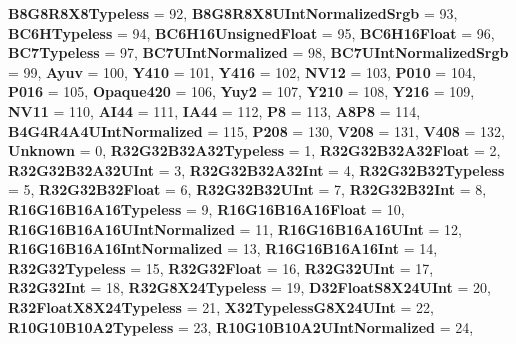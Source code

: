 \begin{DoxyCompactItemize}
{\bfseries B8\+G8\+R8\+X8\+Typeless} = 92, 
{\bfseries B8\+G8\+R8\+X8\+U\+Int\+Normalized\+Srgb} = 93, 
{\bfseries B\+C6\+H\+Typeless} = 94, 
\newline
{\bfseries B\+C6\+H16\+Unsigned\+Float} = 95, 
{\bfseries B\+C6\+H16\+Float} = 96, 
{\bfseries B\+C7\+Typeless} = 97, 
{\bfseries B\+C7\+U\+Int\+Normalized} = 98, 
\newline
{\bfseries B\+C7\+U\+Int\+Normalized\+Srgb} = 99, 
{\bfseries Ayuv} = 100, 
{\bfseries Y410} = 101, 
{\bfseries Y416} = 102, 
\newline
{\bfseries N\+V12} = 103, 
{\bfseries P010} = 104, 
{\bfseries P016} = 105, 
{\bfseries Opaque420} = 106, 
\newline
{\bfseries Yuy2} = 107, 
{\bfseries Y210} = 108, 
{\bfseries Y216} = 109, 
{\bfseries N\+V11} = 110, 
\newline
{\bfseries A\+I44} = 111, 
{\bfseries I\+A44} = 112, 
{\bfseries P8} = 113, 
{\bfseries A8\+P8} = 114, 
\newline
{\bfseries B4\+G4\+R4\+A4\+U\+Int\+Normalized} = 115, 
{\bfseries P208} = 130, 
{\bfseries V208} = 131, 
{\bfseries V408} = 132, 
\newline
{\bfseries Unknown} = 0, 
{\bfseries R32\+G32\+B32\+A32\+Typeless} = 1, 
{\bfseries R32\+G32\+B32\+A32\+Float} = 2, 
{\bfseries R32\+G32\+B32\+A32\+U\+Int} = 3, 
\newline
{\bfseries R32\+G32\+B32\+A32\+Int} = 4, 
{\bfseries R32\+G32\+B32\+Typeless} = 5, 
{\bfseries R32\+G32\+B32\+Float} = 6, 
{\bfseries R32\+G32\+B32\+U\+Int} = 7, 
\newline
{\bfseries R32\+G32\+B32\+Int} = 8, 
{\bfseries R16\+G16\+B16\+A16\+Typeless} = 9, 
{\bfseries R16\+G16\+B16\+A16\+Float} = 10, 
{\bfseries R16\+G16\+B16\+A16\+U\+Int\+Normalized} = 11, 
\newline
{\bfseries R16\+G16\+B16\+A16\+U\+Int} = 12, 
{\bfseries R16\+G16\+B16\+A16\+Int\+Normalized} = 13, 
{\bfseries R16\+G16\+B16\+A16\+Int} = 14, 
{\bfseries R32\+G32\+Typeless} = 15, 
\newline
{\bfseries R32\+G32\+Float} = 16, 
{\bfseries R32\+G32\+U\+Int} = 17, 
{\bfseries R32\+G32\+Int} = 18, 
{\bfseries R32\+G8\+X24\+Typeless} = 19, 
\newline
{\bfseries D32\+Float\+S8\+X24\+U\+Int} = 20, 
{\bfseries R32\+Float\+X8\+X24\+Typeless} = 21, 
{\bfseries X32\+Typeless\+G8\+X24\+U\+Int} = 22, 
{\bfseries R10\+G10\+B10\+A2\+Typeless} = 23, 
\newline
{\bfseries R10\+G10\+B10\+A2\+U\+Int\+Normalized} = 24, 

\end{DoxyCompactItemize}
